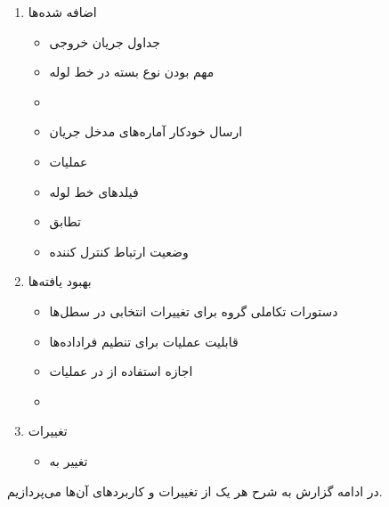 \begin{enumerate}[label=\Alph*]
	\item 
اضافه شده‌ها
	\begin{itemize}[noitemsep,topsep=0pt,parsep=0pt,partopsep=0pt]
		\item جداول جریان خروجی
		\item مهم بودن نوع بسته در خط لوله
		\item {}
		\item ارسال خودکار آماره‌های مدخل جریان
		\item عملیات 
		\item فیلد‌های خط لوله 
		\item تطابق 
		\item وضعیت ارتباط کنترل کننده
	\end{itemize}
	\item
بهبود یافته‌ها
	\begin{itemize}[noitemsep,topsep=0pt,parsep=0pt,partopsep=0pt]
		\item دستورات تکاملی گروه برای تغییرات انتخابی در سطل‌ها
		\item قابلیت عملیات  برای تنطیم فراداده‌ها
		\item اجازه استفاده از  در عملیات 
		\item {}
	\end{itemize}
	\item
تغییرات
	\begin{itemize}[noitemsep,topsep=0pt,parsep=0pt,partopsep=0pt]
		\item تغییر  به 
	\end{itemize}
\end{enumerate}

در ادامه گزارش به شرح هر یک از تغییرات و کاربرد‌های آن‌ها می‌پردازیم.
\pagebreak

